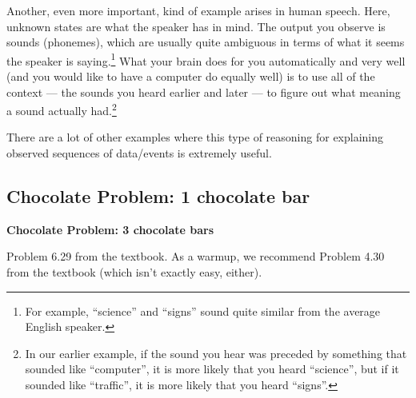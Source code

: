 \documentclass[10pt]{article}
\begin{document}





Another, even more important, kind of example arises in human speech. Here, unknown states are what the speaker has in mind. The output you observe is sounds (phonemes), which are usually quite ambiguous in terms of what it seems the speaker is saying.\footnote{For example, ``science'' and ``signs'' sound quite similar from the average English speaker.} What your brain does for you automatically and very well (and you would like to have a computer do equally well) is to use all of the context --- the sounds you heard earlier and later --- to figure out what meaning a sound actually had.\footnote{In our earlier example, if the sound you hear was preceded by something that sounded like ``computer'', it is more likely that you heard ``science'', but if it sounded like ``traffic'', it is more likely that you heard ``signs''.}

There are a lot of other examples where this type of reasoning for explaining observed sequences of data/events is extremely useful.

\subsection*{Chocolate Problem: 1 chocolate bar}
  \textbf{Chocolate Problem: 3 chocolate bars}
  
  Problem 6.29 from the textbook.
  As a warmup, we recommend Problem 4.30 from the textbook (which isn't exactly easy, either).
\end{document}
